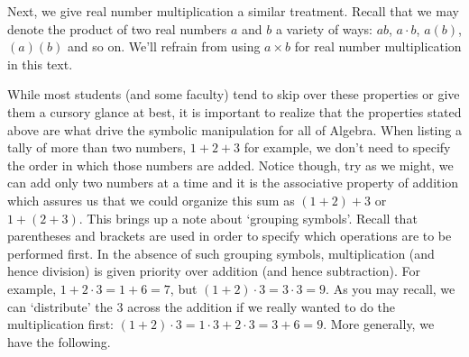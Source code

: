 \medskip

Next, we give real number multiplication a similar treatment.  Recall that we may denote the product of two real numbers $a$ and $b$ a variety of ways:  $ab$, $a \cdot b$, $a(b)$, $(a)(b)$ and so on.  We'll refrain from using $a \times b$ for real number multiplication in this text.

\medskip


\medskip

While most students (and some faculty) tend to skip over these properties or give them a cursory glance at best, it is important to realize that the properties stated above are what drive the symbolic manipulation for all of Algebra.  When listing a tally of more than two numbers, $1 + 2 + 3$\label{howtoaddonetwothree} for example, we don't need to specify the order in which those numbers are added. Notice though, try as we might, we can add only two numbers at a time and it is the associative property of addition which assures us that we could organize this sum as $(1+2) + 3$ or $1+(2+3)$.  This brings up a note about `grouping symbols'.  Recall that parentheses and brackets are used in order to specify which operations are to be performed first.  In the absence of such grouping symbols, multiplication (and hence division) is given priority over addition (and hence subtraction). For example, $1 + 2 \cdot 3 = 1+6 = 7$, but $(1+2) \cdot 3 = 3 \cdot 3 = 9$.  As you may recall, we can `distribute' the $3$ across the addition if we really wanted to do the multiplication first:  $(1+2) \cdot 3 = 1\cdot 3 + 2 \cdot 3 = 3 + 6 = 9$. More generally, we have the following.

